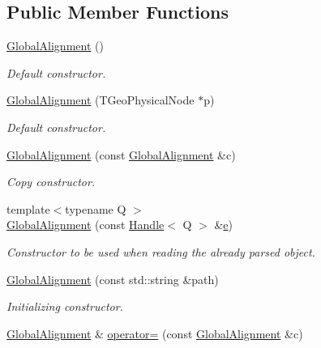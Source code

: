 \subsection*{Public Member Functions}
\begin{DoxyCompactItemize}
\item 
\hyperlink{class_d_d4hep_1_1_alignments_1_1_global_alignment_a022dd4bb7b30b90de999a8d9ed3e7d4a}{Global\+Alignment} ()
\begin{DoxyCompactList}\small\item\em Default constructor. \end{DoxyCompactList}\item 
\hyperlink{class_d_d4hep_1_1_alignments_1_1_global_alignment_a49f7dd112c9adddc872156f145ccaf78}{Global\+Alignment} (T\+Geo\+Physical\+Node $\ast$p)
\begin{DoxyCompactList}\small\item\em Default constructor. \end{DoxyCompactList}\item 
\hyperlink{class_d_d4hep_1_1_alignments_1_1_global_alignment_ac32e57cf2777dd055ace00131dcd8fce}{Global\+Alignment} (const \hyperlink{class_d_d4hep_1_1_alignments_1_1_global_alignment}{Global\+Alignment} \&c)
\begin{DoxyCompactList}\small\item\em Copy constructor. \end{DoxyCompactList}\item 
{\footnotesize template$<$typename Q $>$ }\\\hyperlink{class_d_d4hep_1_1_alignments_1_1_global_alignment_a124efcac78245a83fbd89251af48ef44}{Global\+Alignment} (const \hyperlink{class_d_d4hep_1_1_handle}{Handle}$<$ Q $>$ \&\hyperlink{_volumes_8cpp_a8a9a1f93e9b09afccaec215310e64142}{e})
\begin{DoxyCompactList}\small\item\em Constructor to be used when reading the already parsed object. \end{DoxyCompactList}\item 
\hyperlink{class_d_d4hep_1_1_alignments_1_1_global_alignment_a16080bc886b611de260d54245324c435}{Global\+Alignment} (const std\+::string \&path)
\begin{DoxyCompactList}\small\item\em Initializing constructor. \end{DoxyCompactList}\item 
\hyperlink{class_d_d4hep_1_1_alignments_1_1_global_alignment}{Global\+Alignment} \& \hyperlink{class_d_d4hep_1_1_alignments_1_1_global_alignment_a723fc5d2669d586790c48ff820880171}{operator=} (const \hyperlink{class_d_d4hep_1_1_alignments_1_1_global_alignment}{Global\+Alignment} \&c)

\end{DoxyCompactItemize}
